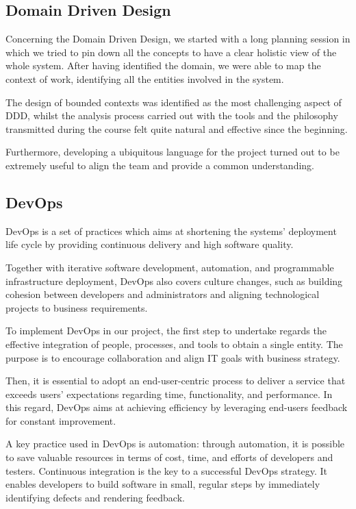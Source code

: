 \documentclass[11pt,a4paper]{article}
\begin{document}
\subsection{Domain Driven Design}
Concerning the Domain Driven Design, we started with a long planning session in which we tried to pin down all the concepts to have a clear holistic view of the whole system.
%
After having identified the domain, we were able to map the context of work, identifying all the entities involved in the system.

The design of bounded contexts was identified as the most challenging aspect of DDD, whilst the analysis process carried out with the tools and the philosophy transmitted during the course felt quite natural and effective since the beginning.

Furthermore, developing a ubiquitous language for the project turned out to be extremely useful to align the team and provide a common understanding.

\subsection{DevOps}
DevOps is a set of practices which aims at shortening the systems' deployment life cycle by providing continuous delivery and high software quality.

Together with iterative software development, automation, and programmable infrastructure deployment, DevOps also covers culture changes, such as building cohesion between developers and administrators and aligning technological projects to business requirements.

To implement DevOps in our project, the first step to undertake regards the effective integration of people, processes, and tools to obtain a single entity.
%
The purpose is to encourage collaboration and align IT goals with business strategy.

Then, it is essential to adopt an end-user-centric  process to deliver a service that exceeds users' expectations regarding time, functionality, and performance.
%
In this regard, DevOps aims at achieving efficiency by leveraging end-users feedback for constant improvement.

A key practice used in DevOps is automation: through automation, it is possible to save valuable resources in terms of cost, time, and efforts of developers and testers.
%
Continuous integration is the key to a successful DevOps strategy.
%
It enables developers to build software in small, regular steps by immediately identifying defects and rendering feedback.
\end{document}
